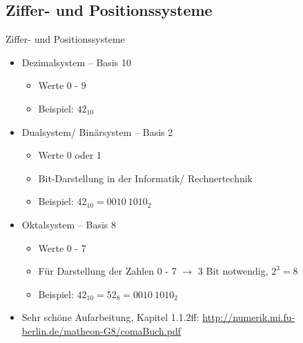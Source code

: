 \documentclass[xcolor=dvipsnames,aspectratio=169]{beamer}
\begin{document}
\subsection{Ziffer- und Positionssysteme}
\begin{frame}{Ziffer- und Positionssysteme}
\vspace{-0.5cm}
\begin{itemize}
	\item Dezimalsystem -- Basis 10
	\begin{itemize}
		\item Werte 0 - 9 
		\item Beispiel: $42_{10}$
	\end{itemize}
	\item Dualsystem/ Binärsystem -- Basis 2
	\begin{itemize}
		\item Werte 0 oder 1
		\item Bit-Darstellung in der Informatik/ Rechnertechnik
		\item Beispiel: $42_{10} = 0010~1010_2$
	\end{itemize}
	\item Oktalsystem -- Basis 8
	\begin{itemize}
		\item Werte 0 - 7
		\item Für Darstellung der Zahlen 0 - 7 $\rightarrow$ 3 Bit notwendig, $2^3 = 8$
		\item Beispiel: $42_{10} = 52_8 = 0010~1010_2$
	\end{itemize}
	\item Sehr schöne Aufarbeitung, Kapitel 1.1.2ff: \url{http://numerik.mi.fu-berlin.de/matheon-G8/comaBuch.pdf}
\end{itemize}
\end{frame}
\end{document}
